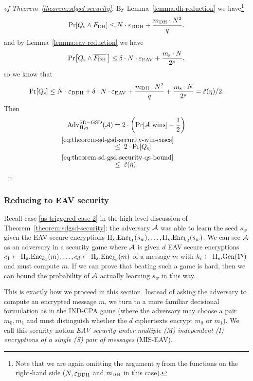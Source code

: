 \begin{proof}[of Theorem~\ref{theorem:sdgsd-security}]
	By Lemma~\ref{lemma:dh-reduction} we have\footnote{Note that we are again omitting the argument $\eta$ from the functions on the right-hand side ($N, \varepsilon_\mathrm{DDH}$ and $m_\mathrm{DH}$ in this case).}
	\[
		\pr{\qs \land \fdh} \le N \cdot \eddh + \frac{\mdh \cdot N^2}{q}.
	\]
	and by Lemma~\ref{lemma:eav-reduction} we have
	\[
		\pr{\qs \land \overline{\fdh}\,} \le \delta \cdot N \cdot \eeav + \frac{\ms \cdot N}{2^\rho},
	\]
	so we know that
	\begin{equation} \label{eq:theorem-sd-gsd-security-qs-bound}
		\pr{\qs} \le N \cdot \eddh + \delta \cdot N \cdot \eeav + \frac{\mdh \cdot N^2}{q} + \frac{\ms \cdot N}{2^\rho} = \tilde{\epsilon}(\eta) / 2.
	\end{equation}
	Then
	\begin{align*}
		\advantage{\Pi}{\eta}{SD-GSD}(\adv) & = 2 \cdot \left(\pr{\wins} - \frac{1}{2}\right)                                                   \\
		                                    & \stackrel{\mathclap{\eqref{eq:theorem-sd-gsd-security-win-cases}}}{\le} \;  2 \cdot \pr{\qs}      \\
		                                    & \stackrel{\mathclap{\eqref{eq:theorem-sd-gsd-security-qs-bound}}}{\le} \; \tilde{\epsilon}(\eta).
	\end{align*}
\end{proof}

\subsubsection{Reducing to EAV security}

Recall case \ref{qs-triggered-case-2} in the high-level discussion of Theorem~\ref{theorem:sdgsd-security}: the adversary $\mathcal{A}$ was able to learn the seed $s_w$ given the EAV secure encryptions $\Pi_s.\mathrm{Enc}_{k_1}(s_w), \ldots, \Pi_s.\mathrm{Enc}_{k_d}(s_w)$. We can see $\mathcal{A}$ as an adversary in a security game where $\mathcal{A}$ is given $d$ EAV secure encryptions $c_1 \leftarrow \Pi_s.\mathrm{Enc}_{k_1}(m), \ldots, c_d \leftarrow \Pi_s.\mathrm{Enc}_{k_d}(m)$ of a message $m$ with $k_i \leftarrow \Pi_s.\mathrm{Gen}(1^\eta)$ and must compute $m$. If we can prove that beating such a game is hard, then we can bound the probability of $\mathcal{A}$ actually learning $s_w$ in this way.

This is exactly how we proceed in this section. Instead of asking the adversary to compute an encrypted message $m$, we turn to a more familiar decisional formulation as in the IND-CPA game (where the adversary may choose a pair $m_0, m_1$ and must distinguish whether the $d$ ciphertexts encrypt $m_0$ or $m_1$). We call this security notion \emph{EAV security under multiple (M) independent (I) encryptions of a single (S) pair of messages} (MIS-EAV).

